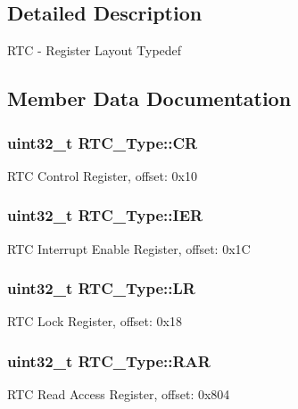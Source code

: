 \subsection{Detailed Description}
R\+TC -\/ Register Layout Typedef 

\subsection{Member Data Documentation}
\subsubsection[{\texorpdfstring{CR}{CR}}]{ uint32\+\_\+t R\+T\+C\+\_\+\+Type\+::\+CR}\hypertarget{structRTC__Type_ac5ff2c2ef6d58e8826deb51d8604c01e}{}\label{structRTC__Type_ac5ff2c2ef6d58e8826deb51d8604c01e}
R\+TC Control Register, offset\+: 0x10 
\subsubsection[{\texorpdfstring{I\+ER}{IER}}]{ uint32\+\_\+t R\+T\+C\+\_\+\+Type\+::\+I\+ER}\hypertarget{structRTC__Type_a80ed5731d6b625b56c6bbeedd8f9bcb8}{}\label{structRTC__Type_a80ed5731d6b625b56c6bbeedd8f9bcb8}
R\+TC Interrupt Enable Register, offset\+: 0x1C 
\subsubsection[{\texorpdfstring{LR}{LR}}]{ uint32\+\_\+t R\+T\+C\+\_\+\+Type\+::\+LR}\hypertarget{structRTC__Type_ac72766ca7476a2a74bd14042bc88aa05}{}\label{structRTC__Type_ac72766ca7476a2a74bd14042bc88aa05}
R\+TC Lock Register, offset\+: 0x18 
\subsubsection[{\texorpdfstring{R\+AR}{RAR}}]{ uint32\+\_\+t R\+T\+C\+\_\+\+Type\+::\+R\+AR}\hypertarget{structRTC__Type_ab35b8ebf2d7d05ced0f5d5cc61ac71af}{}\label{structRTC__Type_ab35b8ebf2d7d05ced0f5d5cc61ac71af}
R\+TC Read Access Register, offset\+: 0x804 
